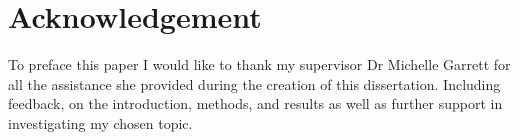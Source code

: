 
\section{Acknowledgement}

To preface this paper I would like to thank my supervisor Dr Michelle Garrett for all the assistance she provided during the creation of this dissertation. Including feedback, on the introduction, methods, and results as well as further support in investigating my chosen topic.